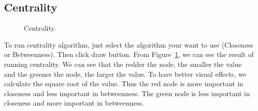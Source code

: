 \documentclass{article}
\begin{document}
\subsection{Centrality}
\begin{figure}[htb]
\centering
{}
   \caption{Centrality.}
    \label{fig:centrality}
\end{figure}
To run centrality algorithm, just select the algorithm your want to use (Closeness or Betweenness). Then click draw button. From Figure~\ref{fig:centrality}, we can see the result of running centrality. We can see that the redder the node, the smaller the value and the greener the node, the larger the value. To have better visual effects, we calculate the square root of the value. Thus the red node is more important in closeness and less important in betweenness. The green node is less important in closeness and more important in betweenness.\\ 
\end{document}
